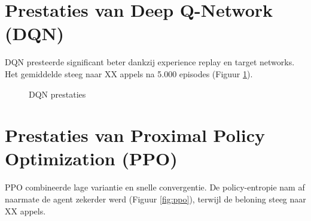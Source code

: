 \documentclass[a4paper,11pt]{report}
\begin{document}
\section{Prestaties van Deep Q-Network (DQN)}
DQN presteerde significant beter dankzij experience replay en target networks.
Het gemiddelde steeg naar XX appels na 5.000 episodes (Figuur \ref{fig:dqn}).

\begin{figure}[h]
    \centering
    \hfill
    \caption{DQN prestaties}
    \label{fig:dqn}
\end{figure}

\section{Prestaties van Proximal Policy Optimization (PPO)}
PPO combineerde lage variantie en snelle convergentie. De policy-entropie nam
af naarmate de agent zekerder werd (Figuur \ref{fig:ppo}), terwijl de beloning
steeg naar {XX} appels.
\end{document}
